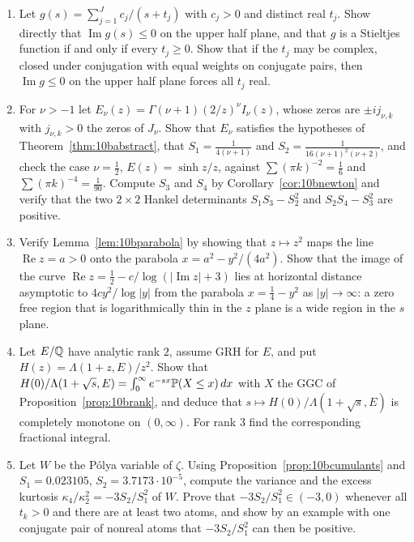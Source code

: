 \begin{enumerate}
\item Let $g(s) = \sum_{j=1}^Jc_j/(s+t_j)$ with $c_j>0$ and distinct real $t_j$. Show directly that $\operatorname{Im}g(s)\le0$ on the upper half plane, and that $g$ is a Stieltjes function if and only if every $t_j\ge0$. Show that if the $t_j$ may be complex, closed under conjugation with equal weights on conjugate pairs, then $\operatorname{Im}g\le0$ on the upper half plane forces all $t_j$ real.
\item For $\nu>-1$ let $E_\nu(z) = \Gamma(\nu+1)(2/z)^\nu I_\nu(z)$, whose zeros are $\pm ij_{\nu,k}$ with $j_{\nu,k}>0$ the zeros of $J_\nu$. Show that $E_\nu$ satisfies the hypotheses of Theorem~\ref{thm:10babstract}, that $S_1 = \frac1{4(\nu+1)}$ and $S_2 = \frac1{16(\nu+1)^2(\nu+2)}$, and check the case $\nu = \frac12$, $E(z) = \sinh z/z$, against $\sum(\pi k)^{-2} = \frac16$ and $\sum(\pi k)^{-4} = \frac1{90}$. Compute $S_3$ and $S_4$ by Corollary~\ref{cor:10bnewton} and verify that the two $2\times2$ Hankel determinants $S_1S_3-S_2^2$ and $S_2S_4-S_3^2$ are positive.
\item\label{ex:10bzerofree} Verify Lemma~\ref{lem:10bparabola} by showing that $z\mapsto z^2$ maps the line $\operatorname{Re}z = a>0$ onto the parabola $x = a^2-y^2/(4a^2)$. Show that the image of the curve $\operatorname{Re}z = \frac12-c/\log(|\operatorname{Im}z|+3)$ lies at horizontal distance asymptotic to $4cy^2/\log|y|$ from the parabola $x = \frac14-y^2$ as $|y|\to\infty$: a zero free region that is logarithmically thin in the $z$ plane is a wide region in the $s$ plane.
\item Let $E/\mathbb{Q}$ have analytic rank $2$, assume GRH for $E$, and put $H(z) = \Lambda(1+z,E)/z^2$. Show that $H(0)/\Lambda(1+\sqrt s,E) = \int_0^\infty e^{-sx}\mathbb{P}(X\le x)\,dx$ with $X$ the GGC of Proposition~\ref{prop:10brank}, and deduce that $s\mapsto H(0)/\Lambda(1+\sqrt s,E)$ is completely monotone on $(0,\infty)$. For rank $3$ find the corresponding fractional integral.
\item Let $W$ be the P\'olya variable of $\zeta$. Using Proposition~\ref{prop:10bcumulants} and $S_1 = 0.023105$, $S_2 = 3.7173\cdot10^{-5}$, compute the variance and the excess kurtosis $\kappa_4/\kappa_2^2 = -3S_2/S_1^2$ of $W$. Prove that $-3S_2/S_1^2\in(-3,0)$ whenever all $t_k>0$ and there are at least two atoms, and show by an example with one conjugate pair of nonreal atoms that $-3S_2/S_1^2$ can then be positive.
\end{enumerate}

